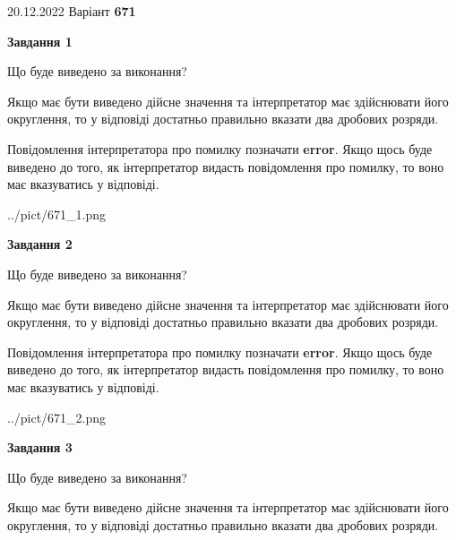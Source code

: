 \documentclass[12pt, ukrainian]{article}
\begin{document}
{20.12.2022 Варіант \No \textbf { 671 }\par}
{
\begin {Large}

{\begin {center}\textbf{Завдання 1}\end {center}}\par
Що буде виведено за виконання? \par

Якщо має бути виведено дійсне значення та інтерпретатор має здійснювати його округлення, 
то у відповіді достатньо правильно вказати два дробових розряди.

Повідомлення інтерпретатора про помилку позначати \textbf{error}.
Якщо щось буде виведено до того, як інтерпретатор видасть повідомлення про помилку, 
то воно має вказуватись у відповіді. \par

\begin{center}
	{../pict/671_1.png}
\end{center}
\newpage

{\begin {center}\textbf{Завдання 2}\end {center}}\par
Що буде виведено за виконання? \par

Якщо має бути виведено дійсне значення та інтерпретатор має здійснювати його округлення, 
то у відповіді достатньо правильно вказати два дробових розряди.

Повідомлення інтерпретатора про помилку позначати \textbf{error}.
Якщо щось буде виведено до того, як інтерпретатор видасть повідомлення про помилку, 
то воно має вказуватись у відповіді. \par

\begin{center}
	{../pict/671_2.png}
\end{center}
\newpage

{\begin {center}\textbf{Завдання 3}\end {center}}\par
Що буде виведено за виконання? \par

Якщо має бути виведено дійсне значення та інтерпретатор має здійснювати його округлення, 
то у відповіді достатньо правильно вказати два дробових розряди.


\end{Large}}
\end{document}
